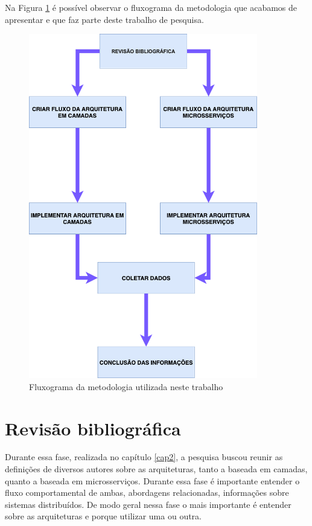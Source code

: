 Na Figura \ref{fig:flow-metodologia} é possível observar o fluxograma da metodologia que acabamos de apresentar e que faz parte deste trabalho de pesquisa.

\begin{figure}[htbp]
    \hypertarget{arquitetura-camadas2}{%
        \caption{ Fluxograma da metodologia utilizada neste trabalho}
        \begin{center}
          \includegraphics[width=10cm]{Monografia-FormatoLatex/Imagens/flow-metodologia.png}
        \end{center}
    }
    \label{fig:flow-metodologia}
\end{figure}

\section{Revisão bibliográfica}
Durante essa fase, realizada no capítulo \ref{cap2}, a pesquisa buscou reunir as definições de diversos autores sobre as arquiteturas, tanto a baseada em camadas, quanto a baseada em microsserviços. Durante essa fase é importante entender o fluxo comportamental de ambas, abordagens relacionadas, informações sobre sistemas distribuídos. De modo geral nessa fase o mais importante é entender sobre as arquiteturas e porque utilizar uma ou outra.

